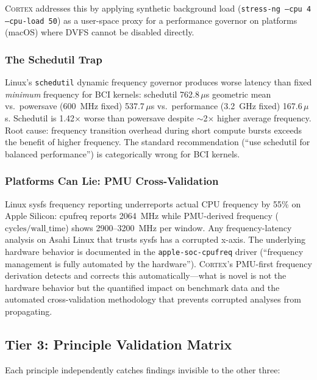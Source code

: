 \documentclass[sigplan,10pt]{acmart}
\newcommand{\cortex}{\textsc{Cortex}}
\begin{document}
\cortex{} addresses this by applying synthetic background load (\texttt{stress-ng --cpu 4 --cpu-load 50}) as a user-space proxy for a performance governor on platforms (macOS) where DVFS cannot be disabled directly.

\subsubsection{The Schedutil Trap}
\label{sec:schedutil}

Linux's \texttt{schedutil} dynamic frequency governor produces worse latency than fixed \emph{minimum} frequency for BCI kernels: schedutil 762.8\,$\mu$s geometric mean vs.\ powersave (600~MHz fixed) 537.7\,$\mu$s vs.\ performance (3.2~GHz fixed) 167.6\,$\mu$s. Schedutil is 1.42$\times$ worse than powersave despite $\sim$2$\times$ higher average frequency. Root cause: frequency transition overhead during short compute bursts exceeds the benefit of higher frequency. The standard recommendation (``use schedutil for balanced performance'') is categorically wrong for BCI kernels.

\subsubsection{Platforms Can Lie: PMU Cross-Validation}
\label{sec:pmu-cross}

Linux sysfs frequency reporting underreports actual CPU frequency by 55\% on Apple Silicon: cpufreq reports 2064~MHz while PMU-derived frequency ($\text{cycles}/\text{wall\_time}$) shows 2900--3200~MHz per window. Any frequency-latency analysis on Asahi Linux that trusts sysfs has a corrupted x-axis. The underlying hardware behavior is documented in the \texttt{apple-soc-cpufreq} driver (``frequency management is fully automated by the hardware''). \cortex{}'s PMU-first frequency derivation detects and corrects this automatically---what is novel is not the hardware behavior but the quantified impact on benchmark data and the automated cross-validation methodology that prevents corrupted analyses from propagating.

\subsection{Tier 3: Principle Validation Matrix}
\label{sec:necessity}

Each principle independently catches findings invisible to the other three:
\end{document}
